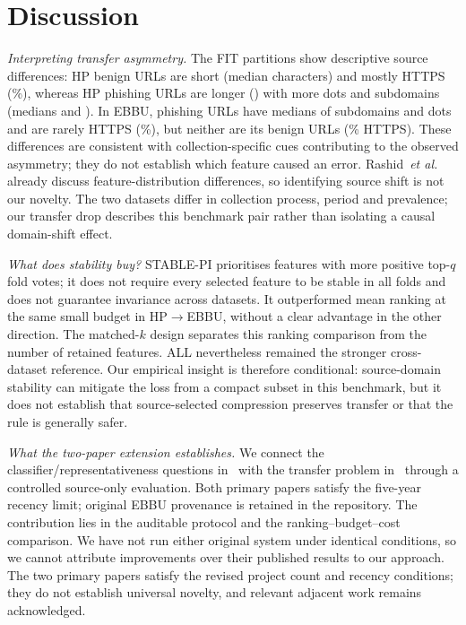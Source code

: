 \section{Discussion}
\textit{Interpreting transfer asymmetry.} The FIT partitions show descriptive source differences: HP benign URLs are short (median  characters) and mostly HTTPS (\%), whereas HP phishing URLs are longer () with more dots and subdomains (medians  and ). In EBBU, phishing URLs have medians of  subdomains and  dots and are rarely HTTPS (\%), but neither are its benign URLs (\% HTTPS). These differences are consistent with collection-specific cues contributing to the observed asymmetry; they do not establish which feature caused an error. Rashid~\textit{et al.}~\cite{rashid2024} already discuss feature-distribution differences, so identifying source shift is not our novelty. The two datasets differ in collection process, period and prevalence; our transfer drop describes this benchmark pair rather than isolating a causal domain-shift effect.

\textit{What does stability buy?} STABLE-PI prioritises features with more positive top-$q$ fold votes; it does not require every selected feature to be stable in all folds and does not guarantee invariance across datasets. It outperformed mean ranking at the same small budget in HP$\rightarrow$EBBU, without a clear advantage in the other direction. The matched-$k$ design separates this ranking comparison from the number of retained features. ALL nevertheless remained the stronger cross-dataset reference. Our empirical insight is therefore conditional: source-domain stability can mitigate the loss from a compact subset in this benchmark, but it does not establish that source-selected compression preserves transfer or that the rule is generally safer.

\textit{What the two-paper extension establishes.} We connect the classifier/representativeness questions in~\cite{sanchez2022} with the transfer problem in~\cite{rashid2024} through a controlled source-only evaluation. Both primary papers satisfy the five-year recency limit; original EBBU provenance is retained in the repository. The contribution lies in the auditable protocol and the ranking--budget--cost comparison. We have not run either original system under identical conditions, so we cannot attribute improvements over their published results to our approach. The two primary papers satisfy the revised project count and recency conditions; they do not establish universal novelty, and relevant adjacent work remains acknowledged.

